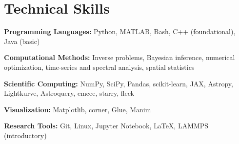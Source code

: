 \section{Technical Skills}
\vspace{2pt}

{\raggedright
\setlength{\parskip}{2pt}
\textbf{Programming Languages:} Python, MATLAB, Bash, C++ (foundational), Java (basic)\par
\textbf{Computational Methods:} Inverse problems, Bayesian inference, numerical optimization, time-series and spectral analysis, spatial statistics\par
\textbf{Scientific Computing:} NumPy, SciPy, Pandas, scikit-learn, JAX, Astropy, Lightkurve, Astroquery, emcee, starry, fleck\par
\textbf{Visualization:} Matplotlib, corner, Glue, Manim\par
\textbf{Research Tools:} Git, Linux, Jupyter Notebook, \LaTeX, LAMMPS (introductory)\par
}
